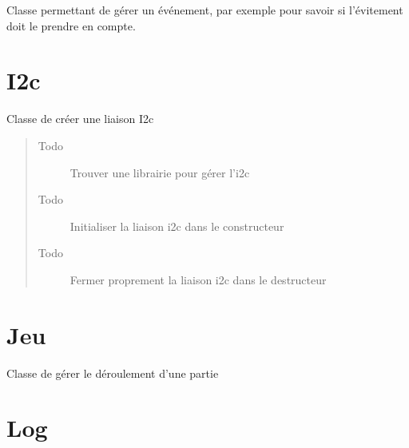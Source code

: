 \documentclass[letterpaper,10pt,french]{sphinxmanual}
\begin{document}
\begin{fulllineitems}
\label{evenement:lib.evenement.Evenement}
Classe permettant de gérer un événement, par exemple pour savoir si l'évitement doit le prendre en compte.

\end{fulllineitems}



\chapter{I2c}
\label{i2c:i2c}\label{i2c::doc}\label{i2c:module-lib.i2c}

\begin{fulllineitems}
\label{i2c:lib.i2c.I2c}
Classe de créer une liaison I2c
\begin{quote}\begin{description}
\item[{Todo }] \leavevmode
Trouver une librairie pour gérer l'i2c

\item[{Todo }] \leavevmode
Initialiser la liaison i2c dans le constructeur

\item[{Todo }] \leavevmode
Fermer proprement la liaison i2c dans le destructeur

\end{description}\end{quote}

\end{fulllineitems}



\chapter{Jeu}
\label{jeu:module-lib.jeu}\label{jeu::doc}\label{jeu:jeu}

\begin{fulllineitems}
\label{jeu:lib.jeu.Jeu}
Classe de gérer le déroulement d'une partie

\end{fulllineitems}



\chapter{Log}
\label{log:module-lib.log}\label{log::doc}\label{log:log}
\end{document}
